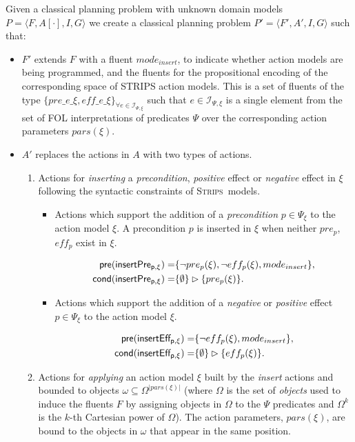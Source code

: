 \documentclass{article}
\newcommand{\tup}[1]{{\langle #1 \rangle}}
\newcommand{\pre}{\mathsf{pre}}     %
\newcommand{\cond}{\mathsf{cond}}   %
\newcommand{\strips}{\textsc{Strips}}
\begin{document}
Given a classical planning problem with unknown domain models $P=\tup{F,A[\cdot],I,G}$ we create a classical planning problem $P'=\tup{F',A',I,G}$ such that:
\begin{itemize}
\item $F'$ extends $F$ with a fluent $mode_{insert}$, to indicate whether action models are being programmed, and the fluents for the propositional encoding of the corresponding space of STRIPS action models. This is a set of fluents of the type $\{pre\_e\_\xi, eff\_e\_\xi\}_{\forall e\in{\mathcal I}_{\Psi,\xi}}$ such that $e\in{\mathcal I}_{\Psi,\xi}$ is a single element from the set of FOL interpretations of predicates $\Psi$ over the corresponding action parameters $pars(\xi)$. 

\item $A'$ replaces the actions in $A$ with two types of actions.
\begin{enumerate}
\item Actions for {\em inserting} a {\em precondition}, {\em positive} effect or {\em negative} effect in $\xi$ following the syntactic constraints of \strips\ models. 
\begin{itemize}
\item Actions which support the addition of a {\em precondition} $p\in \Psi_{\xi}$ to the action model $\xi$. A precondition $p$ is inserted in $\xi$ when neither $pre_p$, $eff_p$ exist in $\xi$.

\begin{small}
\begin{align*}
\hspace*{7pt}\pre(\mathsf{insertPre_{p,\xi}})=&\{\neg pre_{p}(\xi), \neg eff_{p}(\xi), mode_{insert}\},\\
\cond(\mathsf{insertPre_{p,\xi}})=&\{\emptyset\}\rhd\{pre_{p}(\xi)\}.
\end{align*}
\end{small}

\item Actions which support the addition of a {\em negative} or {\em positive} effect $p\in \Psi_{\xi}$ to the action model $\xi$. 

\begin{small}
\begin{align*}
\hspace*{7pt}\pre(\mathsf{insertEff_{p,\xi}})=&\{\neg eff_{p}(\xi), mode_{insert}\},\\
\cond(\mathsf{insertEff_{p,\xi}})=&\{\emptyset\}\rhd\{eff_{p}(\xi)\}.
\end{align*}
\end{small}
\end{itemize}

\item Actions for {\em applying} an action model $\xi$ built by the {\em insert} actions and bounded to objects $\omega\subseteq\Omega^{|pars(\xi)|}$ (where $\Omega$ is the set of {\em objects} used to induce the fluents $F$ by assigning objects in $\Omega$ to the $\Psi$ predicates and $\Omega^k$ is the $k$-th Cartesian power of $\Omega$). The action parameters, $pars(\xi)$, are bound to the objects in $\omega$ that appear in the same position.
\end{enumerate}
\end{itemize}
\end{document}
